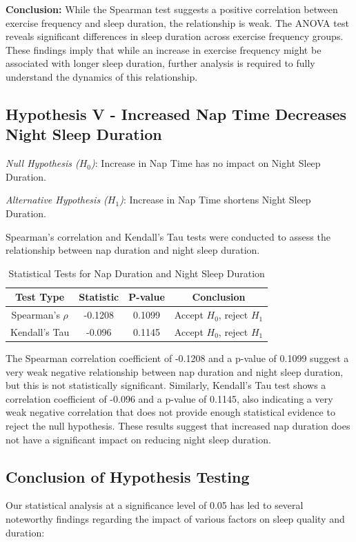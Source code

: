 \documentclass[conference]{IEEEtran}
\begin{document}
\textbf{Conclusion:}
While the Spearman test suggests a positive correlation between exercise frequency and sleep duration, the relationship is weak. The ANOVA test reveals significant differences in sleep duration across exercise frequency groups. These findings imply that while an increase in exercise frequency might be associated with longer sleep duration, further analysis is required to fully understand the dynamics of this relationship.

\subsection*{Hypothesis V - Increased Nap Time Decreases Night Sleep Duration}
\textit{Null Hypothesis (\(H_0\))}: Increase in Nap Time has no impact on Night Sleep Duration.

\textit{Alternative Hypothesis (\(H_1\))}: Increase in Nap Time shortens Night Sleep Duration.

Spearman's correlation and Kendall’s Tau tests were conducted to assess the relationship between nap duration and night sleep duration.

\begin{table}[ht]
\centering
\caption{Statistical Tests for Nap Duration and Night Sleep Duration}
\label{tab:hypothesis5}
\begin{tabular}{|c|c|c|c|}
\hline
\textbf{Test Type} & \textbf{Statistic} & \textbf{P-value} & \textbf{Conclusion} \\
\hline
Spearman's \(\rho\) & -0.1208 & 0.1099 & Accept \(H_0\), reject \(H_1\) \\
\hline
Kendall’s Tau & -0.096 & 0.1145 & Accept \(H_0\), reject \(H_1\) \\
\hline
\end{tabular}
\end{table}

The Spearman correlation coefficient of -0.1208 and a p-value of 0.1099 suggest a very weak negative relationship between nap duration and night sleep duration, but this is not statistically significant. Similarly, Kendall's Tau test shows a correlation coefficient of -0.096 and a p-value of 0.1145, also indicating a very weak negative correlation that does not provide enough statistical evidence to reject the null hypothesis. These results suggest that increased nap duration does not have a significant impact on reducing night sleep duration.

\subsection*{Conclusion of Hypothesis Testing}
Our statistical analysis at a significance level of 0.05 has led to several noteworthy findings regarding the impact of various factors on sleep quality and duration:
\end{document}
